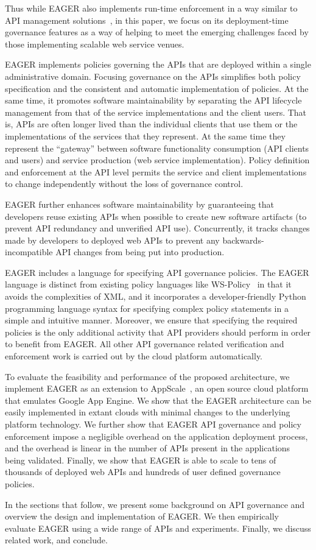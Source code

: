 Thus while
EAGER also implements run-time
enforcement in a way similar to API management
solutions~\cite{wso2am,apigee,layer7,3scale}, in this paper, we focus
on its deployment-time governance features as a way of helping to meet the
emerging challenges faced by those
implementing scalable web service venues. 

EAGER implements policies governing the APIs that are 
deployed within a single administrative domain.  Focusing governance on
the APIs simplifies both policy specification and the consistent
and automatic implementation of policies.  At the same time, it promotes
software maintainability by separating the API lifecycle management from that
of the service implementations and the client users.  That is, APIs are often
longer lived than the individual clients that use them or the implementations
of the services that they represent.  At the same time they represent the
``gateway'' between software functionality consumption 
(API clients and users) and service
production (web service implementation).  Policy definition and enforcement at
the API level permits the service and client implementations to change
independently without the loss of governance control.

EAGER further enhances software maintainability by guaranteeing that 
developers reuse existing APIs when possible to create new software artifacts
(to prevent API redundancy and unverified API use). Concurrently, it
tracks changes made by developers to deployed web APIs to prevent
any backwards-incompatible API changes from being put into production.

EAGER includes a language for specifying 
API governance policies.  The EAGER language is distinct from 
existing policy languages like WS-Policy~\cite{WSPolicy,soagovstandard}
in that it avoids the complexities of XML, 
and it incorporates a developer-friendly Python programming language syntax for 
specifying complex policy statements in a simple and 
intuitive manner. Moreover, we ensure that specifying the required policies 
is the only additional activity that API providers should perform in
order to benefit from EAGER. All other API governance related verification and 
enforcement work is carried out by the cloud platform automatically.

To evaluate the feasibility and performance of the proposed 
architecture, we implement EAGER as an extension to AppScale~\cite{appscale13}, 
an open source
cloud platform that emulates Google App Engine. We show that the EAGER 
architecture can be easily implemented in extant clouds with
minimal changes to the underlying platform technology. We further show that 
EAGER API governance and policy enforcement impose a negligible 
overhead on the application deployment process, and the overhead
is linear in the number of APIs present in the applications being validated.  
Finally, we show that EAGER is able to
scale to tens of thousands of deployed web APIs and hundreds of user 
defined governance policies.

In the sections that follow, we present some background on API governance
and overview the design and implementation of
EAGER. We then empirically evaluate EAGER using a wide range of APIs and
experiments.  Finally, we discuss related work, and conclude.
